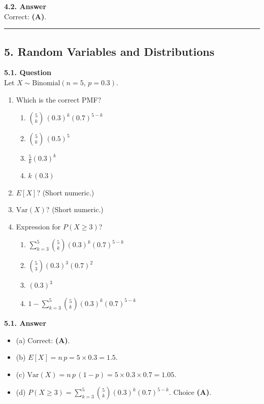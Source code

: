 \documentclass[12pt]{article}
\begin{document}
\noindent
\textbf{4.2. Answer}\\
Correct: \textbf{(A)}.

\hrule

\subsection*{5. Random Variables and Distributions}

\textbf{5.1. Question}\\
Let $X\sim \mathrm{Binomial}(n=5,\,p=0.3).$
\begin{enumerate}[label=(\alph*)]
\item Which is the correct PMF?
  \begin{enumerate}[label=\Alph*.]
  \item $\binom{5}{k}\,(0.3)^k (0.7)^{5-k}$
  \item $\binom{5}{k}\,(0.5)^5$
  \item $\frac{5}{k}(0.3)^k$
  \item $k\,(0.3)$
  \end{enumerate}
\item $E[X]$? (Short numeric.)
\item $\mathrm{Var}(X)$? (Short numeric.)
\item Expression for $P(X\ge 3)$?
  \begin{enumerate}[label=\Alph*.]
  \item $\displaystyle \sum_{k=3}^{5}\binom{5}{k}(0.3)^k(0.7)^{5-k}$
  \item $\binom{5}{3}(0.3)^3(0.7)^2$
  \item $(0.3)^3$
  \item $1-\sum_{k=3}^{5}\binom{5}{k}(0.3)^k(0.7)^{5-k}$
  \end{enumerate}
\end{enumerate}

\noindent
\textbf{5.1. Answer}
\begin{itemize}
\item (a) Correct: \textbf{(A)}. 
\item (b) $E[X]=n\,p=5\times 0.3=1.5.$
\item (c) $\mathrm{Var}(X)=n\,p\,(1-p)=5\times 0.3\times0.7=1.05.$
\item (d) $P(X\ge 3)=\sum_{k=3}^5\binom{5}{k}(0.3)^k(0.7)^{5-k}.$ Choice \textbf{(A)}.
\end{itemize}

\medskip
\end{document}
